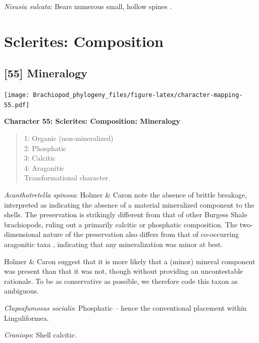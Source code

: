 \documentclass[openany]{book}
\theoremstyle{definition}
\theoremstyle{definition}
\theoremstyle{definition}
\theoremstyle{remark}
\begin{document}
\hypertarget{Nisusia_sulcata-coding-54}{}
\emph{Nisusia sulcata}: Bears numerous small, hollow spines
\citep{Williams2000LinguliformeaCraniiformea}.

\section{Sclerites: Composition}\label{sclerites-composition}

\subsection*{{[}55{]} Mineralogy}\label{mineralogy}

\texttt{[image: Brachiopod\_phylogeny\_files/figure-latex/character-mapping-55.pdf]}

\textbf{Character 55: Sclerites: Composition: Mineralogy}

\begin{quote}
1: Organic (non-mineralized)\\
2: Phosphatic\\
3: Calcitic\\
4: Aragonitic\\
Transformational character.
\end{quote}

\hypertarget{Acanthotretella_spinosa-coding-55}{}
\emph{Acanthotretella spinosa}: Holmer \& Caron
\citeyearpar{Holmer2006Aspinose} note the absence of brittle breakage,
interpreted as indicating the absence of a material mineralized
component to the shells. The preservation is strikingly different from
that of other Burgess Shale brachiopods, ruling out a primarily calcitic
or phosphatic composition. The two-dimensional nature of the
preservation also differs from that of co-occurring aragonitic taxa
\citep[hyoliths;][ p.~273]{Holmer2006Aspinose}, indicating that any
mineralization was minor at best.

Holmer \& Caron \citeyearpar[p.~286]{Holmer2006Aspinose} suggest that it
is more likely that a (minor) mineral component was present than that it
was not, though without providing an uncontestable rationale. To be as
conservative as possible, we therefore code this taxon as ambiguous.

\hypertarget{Clupeafumosus_socialis-coding-55}{}
\emph{Clupeafumosus socialis}: Phosphatic -- hence the conventional
placement within Linguliformea.

\hypertarget{Craniops-coding-55}{}
\emph{Craniops}: Shell calcitic.
\end{document}

